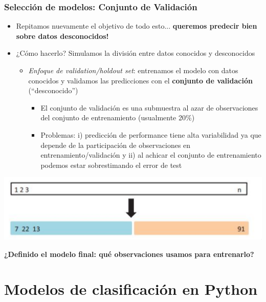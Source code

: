 \documentclass[leqno, 10pt, envcountsect]{beamer}
\numberwithin{equation}{section}
\theoremstyle{definition}
\theoremstyle{example}
\numberwithin{figure}{section}
\numberwithin{table}{section}
\let\olditem\item
\renewcommand{\item}{%
\olditem\vspace{1pt}}
\begin{document}
\begin{frame}[fragile=singleslide]
  \frametitle{Selección de modelos: Conjunto de Validación}
  \begin{itemize}
    \item Repitamos nuevamente el objetivo de todo esto... \textbf{queremos predecir bien
      sobre datos desconocidos!}
    \item ¿Cómo hacerlo? Simulamos la división entre datos conocidos y
      desconocidos
          \begin{itemize}
            \item \textit{Enfoque de validation/holdout set}: entrenamos el
              modelo con datos conocidos y validamos las predicciones con el
              \textbf{conjunto de validación} (\enquote{desconocido})
              \begin{itemize}
                \item El conjunto de validación es una submuestra al azar de
                  observaciones del conjunto de entrenamiento (usualmente
                  20\%)
                \item Problemas: i) predicción de performance tiene alta
                  variabilidad ya que depende de la participación de
                  observaciones en entrenamiento/validación y ii) al achicar el
                  conjunto de entrenamiento podemos estar sobrestimando el error
                  de test
              \end{itemize}
           \end{itemize}
  \end{itemize}
  \begin{center}
    \includegraphics[scale=0.16]{holdout.png}
  \end{center}
  \textbf{¿Definido el modelo final: qué observaciones usamos para entrenarlo?}
\end{frame}

\section{Modelos de clasificación en Python}
\label{sec:modelos_de_clasificacion_en_python}
\end{document}
